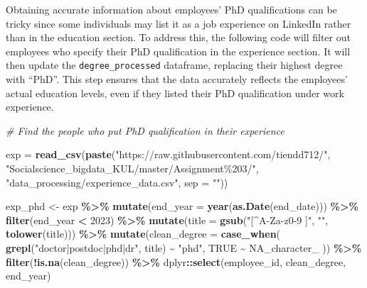 \documentclass[11pt,]{article}
\newenvironment{Shaded}{\begin{snugshade}}{\end{snugshade}}
\newcommand{\AttributeTok}[1]{\textcolor[rgb]{0.13,0.29,0.53}{#1}}
\newcommand{\CommentTok}[1]{\textcolor[rgb]{0.56,0.35,0.01}{\textit{#1}}}
\newcommand{\ConstantTok}[1]{\textcolor[rgb]{0.56,0.35,0.01}{#1}}
\newcommand{\DecValTok}[1]{\textcolor[rgb]{0.00,0.00,0.81}{#1}}
\newcommand{\FunctionTok}[1]{\textcolor[rgb]{0.13,0.29,0.53}{\textbf{#1}}}
\newcommand{\NormalTok}[1]{#1}
\newcommand{\OtherTok}[1]{\textcolor[rgb]{0.56,0.35,0.01}{#1}}
\newcommand{\SpecialCharTok}[1]{\textcolor[rgb]{0.81,0.36,0.00}{\textbf{#1}}}
\newcommand{\StringTok}[1]{\textcolor[rgb]{0.31,0.60,0.02}{#1}}
\begin{document}
\hfill\break
Obtaining accurate information about employees' PhD qualifications can
be tricky since some individuals may list it as a job experience on
LinkedIn rather than in the education section. To address this, the
following code will filter out employees who specify their PhD
qualification in the experience section. It will then update the
\texttt{degree\_processed} dataframe, replacing their highest degree
with ``PhD''. This step ensures that the data accurately reflects the
employees' actual education levels, even if they listed their PhD
qualification under work experience.

\begin{Shaded}
\begin{Highlighting}[]
\CommentTok{\# Find the people who put PhD qualification in their experience }

\NormalTok{exp }\OtherTok{=} \FunctionTok{read\_csv}\NormalTok{(}\FunctionTok{paste}\NormalTok{(}\StringTok{"https://raw.githubusercontent.com/tiendd712/"}\NormalTok{,}
                     \StringTok{"Socialscience\_bigdata\_KUL/master/Assignment\%203/"}\NormalTok{,}
                     \StringTok{"data\_processing/experience\_data.csv"}\NormalTok{, }\AttributeTok{sep =} \StringTok{""}\NormalTok{))}

\NormalTok{exp\_phd }\OtherTok{\textless{}{-}}\NormalTok{ exp }\SpecialCharTok{\%\textgreater{}\%}
  \FunctionTok{mutate}\NormalTok{(}\AttributeTok{end\_year =} \FunctionTok{year}\NormalTok{(}\FunctionTok{as.Date}\NormalTok{(end\_date))) }\SpecialCharTok{\%\textgreater{}\%} 
  \FunctionTok{filter}\NormalTok{(end\_year }\SpecialCharTok{\textless{}} \DecValTok{2023}\NormalTok{) }\SpecialCharTok{\%\textgreater{}\%} 
  \FunctionTok{mutate}\NormalTok{(}\AttributeTok{title =} \FunctionTok{gsub}\NormalTok{(}\StringTok{"[\^{}A{-}Za{-}z0{-}9 ]"}\NormalTok{, }\StringTok{""}\NormalTok{, }\FunctionTok{tolower}\NormalTok{(title))) }\SpecialCharTok{\%\textgreater{}\%} 
  \FunctionTok{mutate}\NormalTok{(}\AttributeTok{clean\_degree =} \FunctionTok{case\_when}\NormalTok{(}
    \FunctionTok{grepl}\NormalTok{(}\StringTok{"doctor|postdoc|phd|dr"}\NormalTok{, title) }\SpecialCharTok{\textasciitilde{}} \StringTok{"phd"}\NormalTok{,}
    \ConstantTok{TRUE} \SpecialCharTok{\textasciitilde{}} \ConstantTok{NA\_character\_}
\NormalTok{  )) }\SpecialCharTok{\%\textgreater{}\%} 
  \FunctionTok{filter}\NormalTok{(}\SpecialCharTok{!}\FunctionTok{is.na}\NormalTok{(clean\_degree)) }\SpecialCharTok{\%\textgreater{}\%} 
\NormalTok{  dplyr}\SpecialCharTok{::}\FunctionTok{select}\NormalTok{(employee\_id, clean\_degree, end\_year)}


\end{Highlighting}
\end{Shaded}
\end{document}
